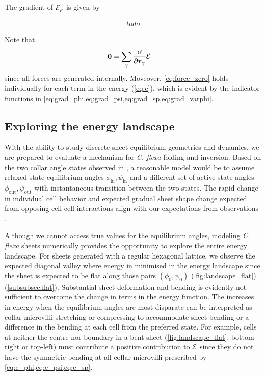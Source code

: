 The gradient of $\mathcal{E}_\varphi$ is given by 

\begin{align}
	todo \label{eq:grad_varphi}
\end{align}

Note that 
\begin{align}
	\bm{0} &= \sum_\gamma \frac{\partial}{\partial\bm{r}_\gamma} \mathcal{E} \label{eq:force_zero}
\end{align}
since all forces are generated internally.
Moveover, \cref{eq:force_zero} holds individually for each term in the energy (\cref{eq:e}), which is evident by the indicator functions in \cref{eq:grad_phi,eq:grad_psi,eq:grad_sp,eq:grad_varphi}.

\subsection{Exploring the energy landscape} \label{subsec:landscape}

With the ability to study discrete sheet equilibrium geometries and dynamics, we are prepared to evaluate a mechanism for \textit{C. flexa} folding and inversion. 
Based on the two collar angle states observed in \citet{brunet2019}, a reasonable model would be to assume relaxed-state equilibrium angles $\phi_{\text{in}}, \psi_{\text{in}}$ and a different set of active-state angles $\phi_{\text{out}}, \psi_{\text{out}}$ with instantaneous transition between the two states. 
The rapid change in individual cell behavior and expected gradual sheet shape change expected from opposing cell-cell interactions align with our expectations from observations \citet{brunet2019}. 

Although we cannot access true values for the equilibrium angles, modeling \textit{C. flexa} sheets numerically provides the opportunity to explore the entire energy landscape. 
For sheets generated with a regular hexagonal lattice, we observe the expected diagonal valley where energy in minimised in the energy landscape since the sheet is expected to be flat along those pairs $(\phi_0, \psi_0)$ (\cref{fig:landscape_flat}) (\cref{subsubsec:flat}).
Substantial sheet deformation and bending is evidently not sufficient to overcome the change in terms in the energy function. 
The increases in energy when the equilibrium angles are most disparate can be interpreted as collar microvilli stretching or compressing to accommodate sheet bending or a difference in the bending at each cell from the preferred state. 
For example, cells at neither the centre nor boundary in a bent sheet (\cref{fig:landscape_flat}, bottom-right or top-left) must contribute a positive contribution to $\mathcal{E}$ since they do not have the symmetric bending at all collar microvilli prescribed by \cref{eq:e_phi,eq:e_psi,eq:e_sp}.

